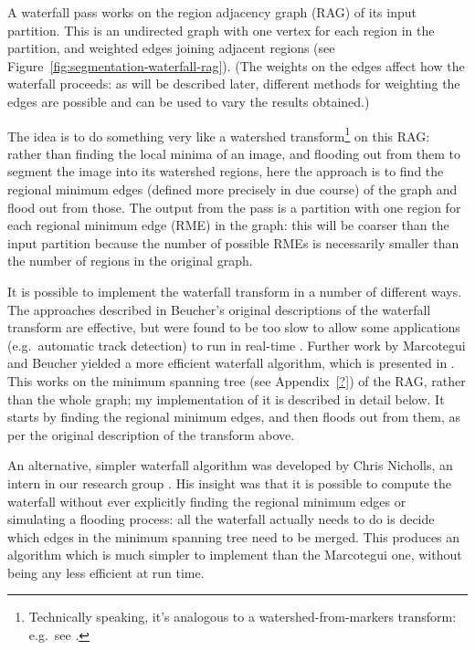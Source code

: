 A waterfall pass works on the region adjacency graph (RAG) of its input partition. This is an undirected graph with one vertex for each region in the partition, and weighted edges joining adjacent regions (see Figure~\ref{fig:segmentation-waterfall-rag}). (The weights on the edges affect how the waterfall proceeds: as will be described later, different methods for weighting the edges are possible and can be used to vary the results obtained.)


The idea is to do something very like a watershed transform\footnote{Technically speaking, it's analogous to a watershed-from-markers transform: e.g.~see \cite{meyer94}.} on this RAG: rather than finding the local minima of an image, and flooding out from them to segment the image into its watershed regions, here the approach is to find the regional minimum edges (defined more precisely in due course) of the graph and flood out from those. The output from the pass is a partition with one region for each regional minimum edge (RME) in the graph: this will be coarser than the input partition because the number of possible RMEs is necessarily smaller than the number of regions in the original graph.

It is possible to implement the waterfall transform in a number of different ways. The approaches described in Beucher's original descriptions of the waterfall transform \cite{beucher90,beucher94} are effective, but were found to be too slow to allow some applications (e.g.~automatic track detection) to run in real-time \cite{marcotegui05}. Further work by Marcotegui and Beucher yielded a more efficient waterfall algorithm, which is presented in \cite{marcotegui05}. This works on the minimum spanning tree (see Appendix~\ref{?}) of the RAG, rather than the whole graph; my implementation of it is described in detail below. It starts by finding the regional minimum edges, and then floods out from them, as per the original description of the transform above.

An alternative, simpler waterfall algorithm was developed by Chris Nicholls, an intern in our research group \cite{nicholls09}. His insight was that it is possible to compute the waterfall without ever explicitly finding the regional minimum edges or simulating a flooding process: all the waterfall actually needs to do is decide which edges in the minimum spanning tree need to be merged. This produces an algorithm which is much simpler to implement than the Marcotegui one, without being any less efficient at run time.

